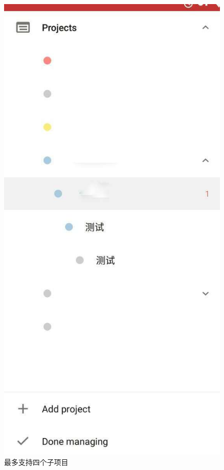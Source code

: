 \begin{itemize}
                \begin{figure}[htbp]
                    \centering
                    \includegraphics[height=0.3\textheight]{figure/quar}
                    \caption{最多支持四个子项目}
                    \label{fig:quar}
                \end{figure}


\end{itemize}
